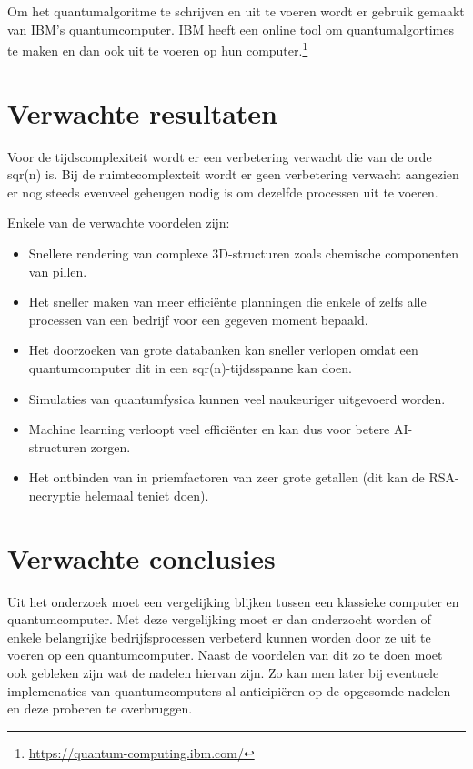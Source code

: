 Om het quantumalgoritme te schrijven en uit te voeren wordt er gebruik gemaakt van IBM's quantumcomputer. IBM heeft een online
tool om quantumalgortimes te maken en dan ook uit te voeren op hun computer.\footnote{\url{https://quantum-computing.ibm.com/}}

\section{Verwachte resultaten}
\label{sec:verwachte_resultaten}

Voor de tijdscomplexiteit wordt er een verbetering verwacht die van de orde sqr(n) is.
Bij de ruimtecomplexteit wordt er geen verbetering verwacht aangezien er nog steeds evenveel geheugen nodig is om dezelfde processen uit te voeren.

Enkele van de verwachte voordelen zijn:
\begin{itemize} 
  \item Snellere rendering van complexe 3D-structuren zoals chemische componenten van pillen.
  \item Het sneller maken van meer efficiënte planningen die enkele of zelfs alle processen van een bedrijf voor een gegeven moment bepaald.
  \item Het doorzoeken van grote databanken kan sneller verlopen omdat een quantumcomputer dit in een sqr(n)-tijdsspanne kan doen.
  \item Simulaties van quantumfysica kunnen veel naukeuriger uitgevoerd worden.
  \item Machine learning verloopt veel efficiënter en kan dus voor betere AI-structuren zorgen.
  \item Het ontbinden van in priemfactoren van zeer grote getallen (dit kan de RSA-necryptie helemaal teniet doen).
\end{itemize}
\section{Verwachte conclusies}
\label{sec:verwachte_conclusies}

Uit het onderzoek moet een vergelijking blijken tussen een klassieke computer en quantumcomputer. Met deze vergelijking moet er dan onderzocht worden of enkele belangrijke bedrijfsprocessen 
verbeterd kunnen worden door ze uit te voeren op een quantumcomputer. Naast de voordelen van dit zo te doen moet ook gebleken zijn wat de nadelen hiervan zijn.
Zo kan men later bij eventuele implemenaties van quantumcomputers al anticipiëren op de opgesomde nadelen en deze proberen te overbruggen.